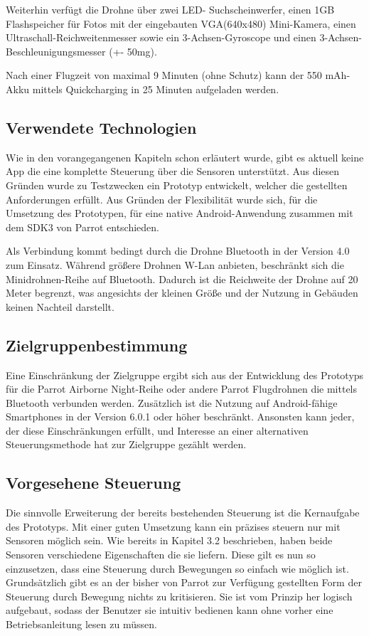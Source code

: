 \documentclass{article}
\begin{document}
Weiterhin verfügt die Drohne über zwei LED- Suchscheinwerfer, einen 1GB Flashspeicher für Fotos mit der eingebauten VGA(640x480) Mini-Kamera, einen Ultraschall-Reichweitenmesser sowie ein 3-Achsen-Gyroscope und einen 3-Achsen-Beschleunigungsmesser (+\/- 50mg).

Nach einer Flugzeit von maximal 9 Minuten (ohne Schutz) kann der 550 mAh-Akku mittels Quickcharging in 25 Minuten aufgeladen werden.

\subsection{Verwendete Technologien}
Wie in den vorangegangenen Kapiteln schon erläutert wurde, gibt es aktuell keine App die eine komplette Steuerung über die Sensoren unterstützt. Aus diesen Gründen wurde zu Testzwecken ein Prototyp entwickelt, welcher die gestellten Anforderungen erfüllt. Aus Gründen der Flexibilität wurde sich, für die Umsetzung des Prototypen, für eine native Android-Anwendung zusammen mit dem SDK3 von Parrot entschieden.

Als Verbindung kommt bedingt durch die Drohne Bluetooth in der Version 4.0 zum Einsatz. Während größere Drohnen W-Lan anbieten, beschränkt sich die Minidrohnen-Reihe auf Bluetooth. Dadurch ist die Reichweite der Drohne auf 20 Meter begrenzt, was angesichts der kleinen Größe und der Nutzung in Gebäuden keinen Nachteil darstellt.

\subsection{Zielgruppenbestimmung}
Eine Einschränkung der Zielgruppe ergibt sich aus der Entwicklung des Prototyps für die Parrot Airborne Night-Reihe oder andere Parrot Flugdrohnen die mittels Bluetooth verbunden werden. Zusätzlich ist die Nutzung auf Android-fähige Smartphones in der Version 6.0.1 oder höher beschränkt. Ansonsten kann jeder, der diese Einschränkungen erfüllt, und Interesse an einer alternativen Steuerungsmethode hat zur Zielgruppe gezählt werden.
  
\subsection{Vorgesehene Steuerung}
Die sinnvolle Erweiterung der bereits bestehenden Steuerung ist die Kernaufgabe des Prototyps. Mit einer guten Umsetzung kann ein präzises steuern nur mit Sensoren möglich sein. Wie bereits in Kapitel 3.2 beschrieben, haben beide Sensoren verschiedene Eigenschaften die sie liefern. Diese gilt es nun so einzusetzen, dass eine Steuerung durch Bewegungen so einfach wie möglich ist. Grundsätzlich gibt es an der bisher von Parrot zur Verfügung gestellten Form der Steuerung durch Bewegung nichts zu kritisieren. Sie ist vom Prinzip her logisch aufgebaut, sodass der Benutzer sie intuitiv bedienen kann ohne vorher eine Betriebsanleitung lesen zu müssen.
\end{document}
